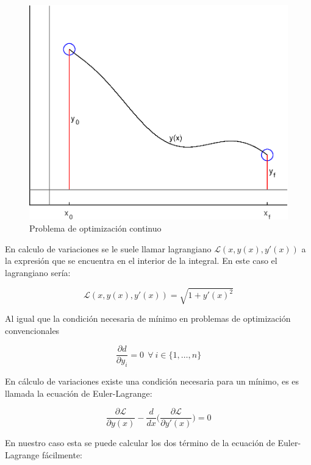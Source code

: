 \begin{figure}[h]
    \centering
    \includegraphics[scale=0.6]{fig/img02}
    \caption{Problema de optimización continuo}
    \label{problema2}
\end{figure}


En calculo de variaciones se le suele llamar lagrangiano $\mathcal{L}(x,y(x),y'(x))$ a la expresión que se encuentra en el interior de la integral. En este caso el lagrangiano sería:

\begin{equation}
    \mathcal{L}(x,y(x),y'(x)) = \sqrt{1 + y'(x) ^2 }
\end{equation}


Al igual que la condición necesaria de mínimo en problemas de optimización convencionales 

\begin{equation}
    \frac{\partial d}{\partial y_i} = 0 \ \ \forall \ i \in \{ 1,\dots,n\}
\end{equation}

En cálculo de variaciones existe una condición necesaria para un mínimo, es es llamada la ecuación de Euler-Lagrange:

\begin{equation}\label{EL}
    \frac{\partial \mathcal{L}}{\partial y(x)} - \frac{d}{dx} \Bigg( \frac{\partial \mathcal{L}}{\partial y'(x)} \Bigg) = 0
\end{equation}

En nuestro caso esta se puede calcular los dos término de la ecuación de Euler-Lagrange fácilmente:

